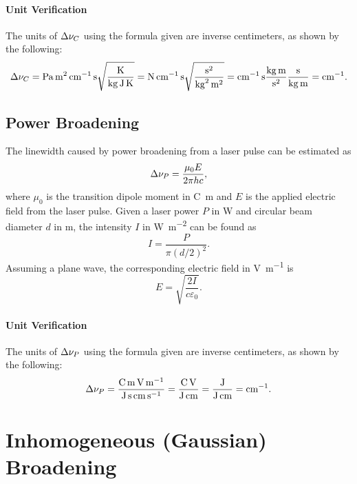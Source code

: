 \paragraph{Unit Verification}

The units of $\adif{\nu}_C$ using the formula given are inverse centimeters, as shown by the following:
\begin{equation*}
    \adif{\nu}_C = \unit{Pa.m^2.cm^{-1}.s}\sqrt{\frac{\unit{K}}{\unit{kg.J.K}}} = \unit{N.cm^{-1}.s}\sqrt{\frac{\unit{s^2}}{\unit{kg^2.m^2}}} = \unit{cm^{-1}.s}\frac{\unit{kg.m}}{\unit{s^2}}\frac{\unit{s}}{\unit{kg.m}} = \unit{cm^{-1}}.
\end{equation*}

\subsection{Power Broadening}

The linewidth caused by power broadening from a laser pulse can be estimated as \cite[36]{bernathSpectraAtomsMolecules2016}
\begin{equation*}
    \adif{\nu}_P = \frac{\mu_0E}{2\pi hc},
\end{equation*}
where $\mu_0$ is the transition dipole moment in \unit{C.m} and $E$ is the applied electric field from the laser pulse.
Given a laser power $P$ in \unit{W} and circular beam diameter $d$ in \unit{m}, the intensity $I$ in \unit{W.m^{-2}} can be found as
\begin{equation*}
    I = \frac{P}{\pi(d/2)^2}.
\end{equation*}
Assuming a plane wave, the corresponding electric field in \unit{V.m^{-1}} is \cite[16]{bernathSpectraAtomsMolecules2016}
\begin{equation*}
    E = \sqrt{\frac{2I}{c\varepsilon_0}}.
\end{equation*}

\paragraph{Unit Verification}

The units of $\adif{\nu}_P$ using the formula given are inverse centimeters, as shown by the following:
\begin{equation*}
    \adif{\nu}_P = \frac{\unit{C.m.V.m^{-1}}}{\unit{J.s.cm.s^{-1}}} = \frac{\unit{C.V}}{\unit{J.cm}} = \frac{\unit{J}}{\unit{J.cm}} = \unit{cm^{-1}}.
\end{equation*}

\section{Inhomogeneous (Gaussian) Broadening}

